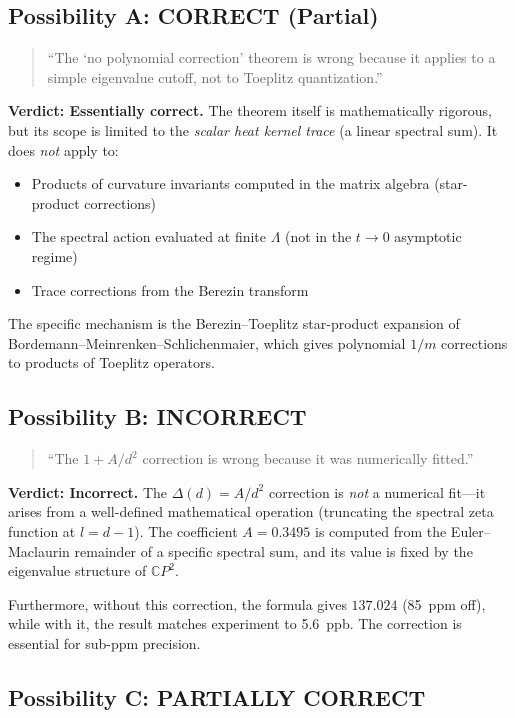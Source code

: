 \documentclass[12pt,a4paper]{article}
\theoremstyle{definition}
\begin{document}
\subsection{Possibility A: CORRECT (Partial)}

\begin{quote}
``The `no polynomial correction' theorem is wrong because it applies
to a simple eigenvalue cutoff, not to Toeplitz quantization.''
\end{quote}

\textbf{Verdict: Essentially correct.}  The theorem itself is
mathematically rigorous, but its scope is limited to the \emph{scalar
heat kernel trace} (a linear spectral sum).  It does \emph{not} apply to:
\begin{itemize}
\item Products of curvature invariants computed in the matrix algebra
  (star-product corrections)
\item The spectral action evaluated at finite $\Lambda$ (not in the
  $t \to 0$ asymptotic regime)
\item Trace corrections from the Berezin transform
\end{itemize}

The specific mechanism is the Berezin--Toeplitz star-product expansion
of Bordemann--Meinrenken--Schlichenmaier, which gives polynomial $1/m$
corrections to products of Toeplitz operators.

\subsection{Possibility B: INCORRECT}

\begin{quote}
``The $1+A/d^2$ correction is wrong because it was numerically fitted.''
\end{quote}

\textbf{Verdict: Incorrect.}  The $\Delta(d) = A/d^2$ correction is
\emph{not} a numerical fit---it arises from a well-defined mathematical
operation (truncating the spectral zeta function at $l = d-1$).  The
coefficient $A = 0.3495$ is computed from the Euler--Maclaurin remainder
of a specific spectral sum, and its value is fixed by the eigenvalue
structure of $\mathbb{C}P^2$.

Furthermore, without this correction, the formula gives $137.024$
(85~ppm off), while with it, the result matches experiment to 5.6~ppb.
The correction is essential for sub-ppm precision.

\subsection{Possibility C: PARTIALLY CORRECT}
\end{document}
